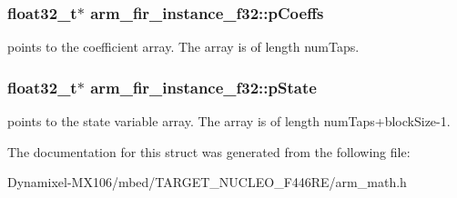 \subsubsection[{\texorpdfstring{p\+Coeffs}{pCoeffs}}]{\setlength{\rightskip}{0pt plus 5cm}float32\+\_\+t$\ast$ arm\+\_\+fir\+\_\+instance\+\_\+f32\+::p\+Coeffs}\hypertarget{structarm__fir__instance__f32_a1c9cfca901d5902afeb640f2831488f4}{}\label{structarm__fir__instance__f32_a1c9cfca901d5902afeb640f2831488f4}
points to the coefficient array. The array is of length num\+Taps. 
\subsubsection[{\texorpdfstring{p\+State}{pState}}]{\setlength{\rightskip}{0pt plus 5cm}float32\+\_\+t$\ast$ arm\+\_\+fir\+\_\+instance\+\_\+f32\+::p\+State}\hypertarget{structarm__fir__instance__f32_a7afcf4022e8560db9b8fd28b0d090a15}{}\label{structarm__fir__instance__f32_a7afcf4022e8560db9b8fd28b0d090a15}
points to the state variable array. The array is of length num\+Taps+block\+Size-\/1. 

The documentation for this struct was generated from the following file\+:\begin{DoxyCompactItemize}
\item 
Dynamixel-\/\+M\+X106/mbed/\+T\+A\+R\+G\+E\+T\+\_\+\+N\+U\+C\+L\+E\+O\+\_\+\+F446\+R\+E/arm\+\_\+math.\+h\end{DoxyCompactItemize}
